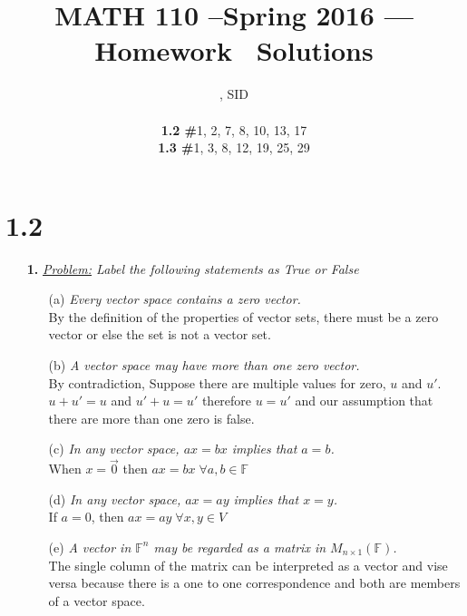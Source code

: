 \documentclass[11pt, fleqn]{article}
\title{MATH 110 --Spring 2016 --- Homework \Homework\ Solutions}
\author{\large{\Name, SID \SID}\\\small{\parbox{0cm}{\begin{tabbing}\textbf{1.2 \#}1, 2, 7, 8, 10, 13, 17\\\textbf{1.3 \#}1, 3, 8, 12, 19, 25, 29\end{tabbing}}}}
\date{}
\begin{document}
\maketitle
\textbf{}

\section*{1.2}

\begin{itemize}
    \setlength\itemsep{5ex}
    \item [\textbf{1.}]
    \textit{\underline{Problem:} Label the following statements as True or False}
    \begin{itemize}
        \item[(a)] \textit{Every vector space contains a zero vector.}\\[1ex]
            \textbf{} By the definition of the properties of vector sets, there must be a zero vector or else the set is not a vector set.\vspace{2ex}
            
        \item[(b)] \textit{A vector space may have more than one zero vector.}\\[1ex]
            \textbf{} By contradiction, Suppose there are multiple values for zero, $u$ and $u'$. $u + u' = u$ and $u' + u = u'$ therefore $u=u'$ and our assumption that there are more than one zero is false.\vspace{2ex}
            
        \item[(c)] \textit{In any vector space, $ax = bx$ implies that $a = b$.}\\[1ex]
            \textbf{} When $x=\vec{0}$ then $ax=bx\;\forall a,b \in \mathbb{F}$\vspace{2ex}
            
        \item[(d)] \textit{In any vector space, $ax = ay$ implies that $x = y$.}\\[1ex]
            \textbf{} If $a = 0$, then $ax=ay\;\forall x,y \in V$\vspace{2ex}
            
        \item[(e)] \textit{A vector in $\mathbb{F}^n$ may be regarded as a matrix in $M_{n\times1}(\mathbb{F})$.}\\[1ex]
            \textbf{} The single column of the matrix can be interpreted as a vector and vise versa because there is a one to one correspondence and both are members of a vector space.\vspace{2ex}
            

\end{itemize}
\end{itemize}
\end{document}
